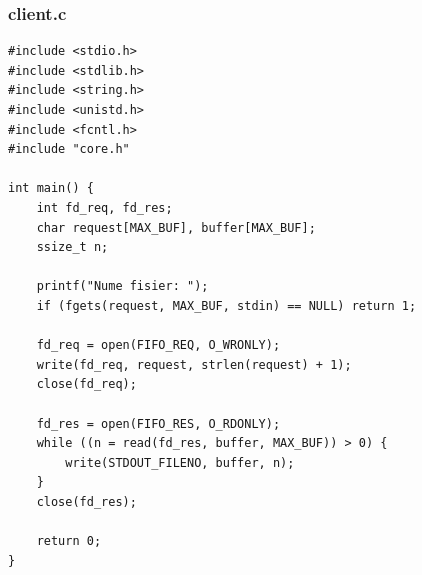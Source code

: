 \documentclass[11pt]{article}
\begin{document}
\subsubsection{client.c}
\label{sec:org96f2772}
\begin{verbatim}
#include <stdio.h>
#include <stdlib.h>
#include <string.h>
#include <unistd.h>
#include <fcntl.h>
#include "core.h"

int main() {
    int fd_req, fd_res;
    char request[MAX_BUF], buffer[MAX_BUF];
    ssize_t n;

    printf("Nume fisier: ");
    if (fgets(request, MAX_BUF, stdin) == NULL) return 1;

    fd_req = open(FIFO_REQ, O_WRONLY);
    write(fd_req, request, strlen(request) + 1);
    close(fd_req);

    fd_res = open(FIFO_RES, O_RDONLY);
    while ((n = read(fd_res, buffer, MAX_BUF)) > 0) {
        write(STDOUT_FILENO, buffer, n);
    }
    close(fd_res);

    return 0;
}
\end{verbatim}
\end{document}
